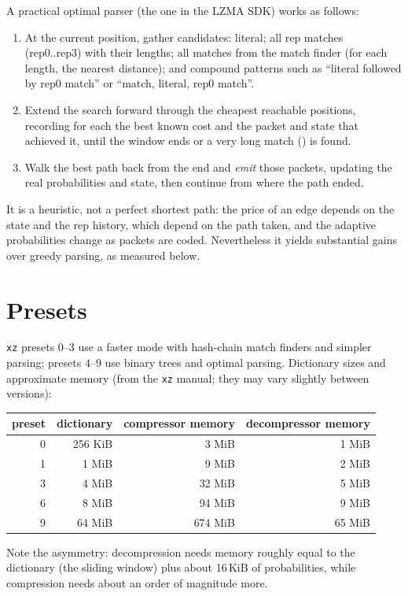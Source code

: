 \documentclass[11pt,a4paper,oneside]{book}
\newcommand{\code}[1]{\texttt{\detokenize{#1}}}
\begin{document}
A practical optimal parser (the one in the LZMA SDK) works as follows:
\begin{enumerate}[leftmargin=2em]
\item At the current position, gather candidates: literal; all rep matches (rep0..rep3) with their lengths; all matches from the match finder (for each length, the nearest distance);
  and compound patterns such as ``literal followed by rep0 match'' or ``match, literal, rep0 match''.
\item Extend the search forward through the cheapest reachable positions, recording for each the best known cost and the packet and state that achieved it, until the window ends
  or a very long match (\code{nice_len}) is found.
\item Walk the best path back from the end and \emph{emit} those packets, updating the real probabilities and state, then continue from where the path ended.
\end{enumerate}
It is a heuristic, not a perfect shortest path: the price of an edge depends on the state and the rep history, which depend on the path taken, and the adaptive probabilities change as
packets are coded. Nevertheless it yields substantial gains over greedy parsing, as measured below.

\section{Presets}

\texttt{xz} presets $0$--$3$ use a faster mode with hash-chain match finders and simpler parsing; presets $4$--$9$ use binary trees and optimal parsing. Dictionary sizes and
approximate memory (from the \texttt{xz} manual; they may vary slightly between versions):
\begin{center}
\small
\begin{tabular}{rrrr}
\toprule
preset & dictionary & compressor memory & decompressor memory\\
\midrule
0 & 256 KiB & 3 MiB & 1 MiB\\
1 & 1 MiB & 9 MiB & 2 MiB\\
3 & 4 MiB & 32 MiB & 5 MiB\\
6 & 8 MiB & 94 MiB & 9 MiB\\
9 & 64 MiB & 674 MiB & 65 MiB\\
\bottomrule
\end{tabular}
\end{center}
Note the asymmetry: decompression needs memory roughly equal to the dictionary (the sliding window) plus about 16\,KiB of probabilities, while compression needs about
an order of magnitude more.
\end{document}
